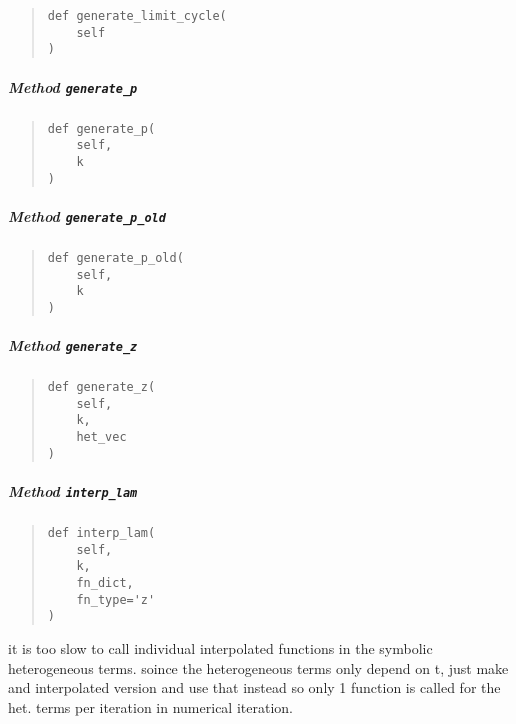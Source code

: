 \documentclass[
  english,
  a4paper,
  oneside]{article}
\begin{document}
\begin{quote}
\begin{verbatim}
def generate_limit_cycle(
    self
)
\end{verbatim}
\end{quote}

\hypertarget{StrongCoupling.StrongCoupling.generate_p}{%
\subparagraph{\texorpdfstring{Method
\texttt{generate\_p}}{Method generate\_p}}\label{StrongCoupling.StrongCoupling.generate_p}}

\begin{quote}
\begin{verbatim}
def generate_p(
    self,
    k
)
\end{verbatim}
\end{quote}

\hypertarget{StrongCoupling.StrongCoupling.generate_p_old}{%
\subparagraph{\texorpdfstring{Method
\texttt{generate\_p\_old}}{Method generate\_p\_old}}\label{StrongCoupling.StrongCoupling.generate_p_old}}

\begin{quote}
\begin{verbatim}
def generate_p_old(
    self,
    k
)
\end{verbatim}
\end{quote}

\hypertarget{StrongCoupling.StrongCoupling.generate_z}{%
\subparagraph{\texorpdfstring{Method
\texttt{generate\_z}}{Method generate\_z}}\label{StrongCoupling.StrongCoupling.generate_z}}

\begin{quote}
\begin{verbatim}
def generate_z(
    self,
    k,
    het_vec
)
\end{verbatim}
\end{quote}

\hypertarget{StrongCoupling.StrongCoupling.interp_lam}{%
\subparagraph{\texorpdfstring{Method
\texttt{interp\_lam}}{Method interp\_lam}}\label{StrongCoupling.StrongCoupling.interp_lam}}

\begin{quote}
\begin{verbatim}
def interp_lam(
    self,
    k,
    fn_dict,
    fn_type='z'
)
\end{verbatim}
\end{quote}

it is too slow to call individual interpolated functions in the symbolic
heterogeneous terms. soince the heterogeneous terms only depend on t,
just make and interpolated version and use that instead so only 1
function is called for the het. terms per iteration in numerical
iteration.
\end{document}
